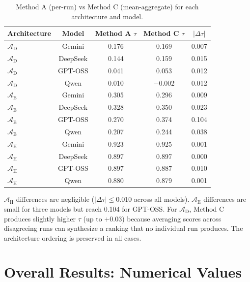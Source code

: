 \documentclass[final,3p,times]{elsarticle}
\begin{document}
\begin{table}[htbp]
\begin{threeparttable}
\small\centering
\caption{Method A (per-run) vs Method C (mean-aggregate) for each architecture and model.}
\label{tab:method_c}
\begin{tabular}{lcccc}
\toprule
Architecture & Model & Method A $\tau$ & Method C $\tau$ & $|\Delta\tau|$ \\
\midrule
$\mathcal{A}_{\text{D}}$ & Gemini & 0.176 & 0.169 & 0.007 \\
$\mathcal{A}_{\text{D}}$ & DeepSeek & 0.144 & 0.159 & 0.015 \\
$\mathcal{A}_{\text{D}}$ & GPT-OSS & 0.041 & 0.053 & 0.012 \\
$\mathcal{A}_{\text{D}}$ & Qwen & 0.010 & $-0.002$ & 0.012 \\
$\mathcal{A}_{\text{E}}$ & Gemini & 0.305 & 0.296 & 0.009 \\
$\mathcal{A}_{\text{E}}$ & DeepSeek & 0.328 & 0.350 & 0.023 \\
$\mathcal{A}_{\text{E}}$ & GPT-OSS & 0.270 & 0.374 & 0.104 \\
$\mathcal{A}_{\text{E}}$ & Qwen & 0.207 & 0.244 & 0.038 \\
$\mathcal{A}_{\text{H}}$ & Gemini & 0.923 & 0.925 & 0.001 \\
$\mathcal{A}_{\text{H}}$ & DeepSeek & 0.897 & 0.897 & 0.000 \\
$\mathcal{A}_{\text{H}}$ & GPT-OSS & 0.897 & 0.887 & 0.010 \\
$\mathcal{A}_{\text{H}}$ & Qwen & 0.880 & 0.879 & 0.001 \\
\bottomrule
\end{tabular}
\end{threeparttable}
\end{table}

$\mathcal{A}_{\text{H}}$ differences are negligible ($|\Delta\tau| \leq 0.010$ across all models). $\mathcal{A}_{\text{E}}$ differences are small for three models but reach 0.104 for GPT-OSS. For $\mathcal{A}_{\text{D}}$, Method C produces slightly higher $\tau$ (up to $+0.03$) because averaging scores across disagreeing runs can synthesize a ranking that no individual run produces. The architecture ordering is preserved in all cases.

\section{Overall Results: Numerical Values}
\label{app:numerical_results}
\end{document}
